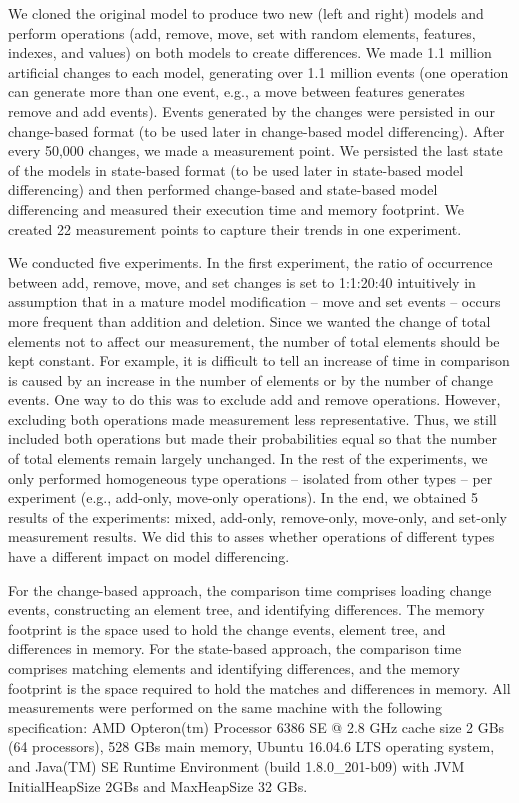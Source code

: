 We cloned the original model to produce two new (left and right) models and perform operations (\textsf{add}, \textsf{remove}, \textsf{move}, \textsf{set} with random elements, features, indexes, and values) on both models to create differences. We made 1.1 million artificial changes to each model, generating over 1.1 million events (one operation can generate more than one event, e.g., a \textsf{move} between features generates \textsf{remove} and \textsf{add} events). Events generated by the changes were persisted in our change-based format (to be used later in change-based model differencing). After every 50,000 changes, we made a measurement point. We persisted the last state of the models in state-based format (to be used later in state-based model differencing) and then performed change-based and state-based model differencing and measured their execution time and memory footprint. We created 22 measurement points to capture their trends in one experiment. 

We conducted five experiments. In the first experiment, the ratio of occurrence between \textsf{add}, \textsf{remove}, \textsf{move}, and \textsf{set} changes is set to 1:1:20:40 intuitively in assumption that in a mature model modification -- \textsf{move} and \textsf{set} events -- occurs more frequent than addition and deletion. Since we wanted the change of total elements not to affect our measurement, the number of total elements should be kept constant. For example, it is difficult to tell an increase of time in comparison is caused by an increase in the number of elements or by the number of change events. One way to do this was to exclude \textsf{add} and \textsf{remove} operations. However, excluding both operations made measurement less representative. Thus, we still included both operations but made their probabilities equal so that the number of total elements remain largely unchanged. In the rest of the experiments,
we only performed homogeneous type operations -- isolated from other types -- per experiment (e.g., add-only, move-only operations). In the end, we obtained 5 results of the experiments: mixed, add-only, remove-only, move-only, and set-only measurement results. We did this to asses whether operations of different types have a different impact on model differencing.

For the change-based approach, the comparison time comprises loading change events, constructing an element tree, and identifying differences. The memory footprint is the space used to hold the change events, element tree, and differences in memory. For the state-based approach, the comparison time comprises matching elements and identifying differences, and the memory footprint is the space required to hold the matches and differences in memory. All measurements were performed on the same machine with the following specification: AMD Opteron(tm) Processor 6386 SE @ 2.8 GHz cache size 2 GBs (64 processors), 528 GBs main memory, Ubuntu 16.04.6 LTS operating system, and Java(TM) SE Runtime Environment (build 1.8.0\_201-b09) with JVM \textsf{InitialHeapSize} 2GBs and \textsf{MaxHeapSize} 32 GBs.

